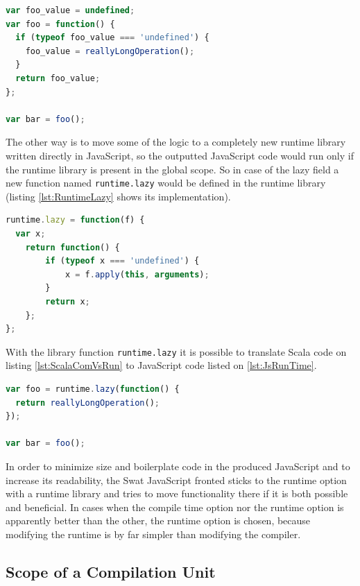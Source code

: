 \documentclass[12pt,a4paper]{report}
\begin{document}
\begin{lstlisting}[language=JavaScript,caption={Compile time option outcome.},label={lst:JsCompileTime}]
var foo_value = undefined;
var foo = function() {
  if (typeof foo_value === 'undefined') {
    foo_value = reallyLongOperation();
  }
  return foo_value;
};

var bar = foo();
\end{lstlisting} 

The other way is to move some of the logic to a completely new runtime library written directly in JavaScript, so the outputted JavaScript code would run only if the runtime library is present in the global scope. So in case of the lazy field a new function named \texttt{runtime.lazy} would be defined in the runtime library (listing \ref{lst:RuntimeLazy} shows its implementation).

\begin{lstlisting}[language=JavaScript,caption={Runtime function that lazifies evaluation.},label={lst:RuntimeLazy}]
runtime.lazy = function(f) {
  var x;
	return function() {
		if (typeof x === 'undefined') {
			x = f.apply(this, arguments);
		}
		return x;
	};
};
\end{lstlisting}

With the library function \texttt{runtime.lazy} it is possible to translate Scala code on listing \ref{lst:ScalaComVsRun} to JavaScript code listed on \ref{lst:JsRunTime}.

\begin{lstlisting}[language=JavaScript,caption={Runtime option outcome.},label={lst:JsRunTime}]
var foo = runtime.lazy(function() {
  return reallyLongOperation();
});

var bar = foo();
\end{lstlisting}

In order to minimize size and boilerplate code in the produced JavaScript and to increase its readability, the Swat JavaScript fronted sticks to the runtime option with a runtime library and tries to move functionality there if it is both possible and beneficial. In cases when the compile time option nor the runtime option is apparently better than the other, the runtime option is chosen, because modifying the runtime is by far simpler than modifying the compiler.

\subsection{Scope of a Compilation Unit}
\end{document}
